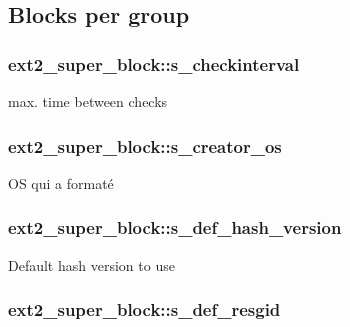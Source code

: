 \subsection*{Blocks per group}\hypertarget{structext2__super__block_a41729c3eb872813abe1489de88e6f736}{
\subsubsection[{s\-\_\-checkinterval}]{ ext2\-\_\-super\-\_\-block\-::s\-\_\-checkinterval}}\label{structext2__super__block_a41729c3eb872813abe1489de88e6f736}
max. time between checks \hypertarget{structext2__super__block_a421f09691aa0911da60db7ef23dc30ca}{
\subsubsection[{s\-\_\-creator\-\_\-os}]{ ext2\-\_\-super\-\_\-block\-::s\-\_\-creator\-\_\-os}}\label{structext2__super__block_a421f09691aa0911da60db7ef23dc30ca}
O\-S qui a formaté \hypertarget{structext2__super__block_a3120768bf3ac685a2e5d38d84ec3c5b8}{
\subsubsection[{s\-\_\-def\-\_\-hash\-\_\-version}]{ ext2\-\_\-super\-\_\-block\-::s\-\_\-def\-\_\-hash\-\_\-version}}\label{structext2__super__block_a3120768bf3ac685a2e5d38d84ec3c5b8}
Default hash version to use \hypertarget{structext2__super__block_a2973f6cda59f008e1f649c6d68ddafd6}{
\subsubsection[{s\-\_\-def\-\_\-resgid}]{ ext2\-\_\-super\-\_\-block\-::s\-\_\-def\-\_\-resgid}}\label{structext2__super__block_a2973f6cda59f008e1f649c6d68ddafd6}
